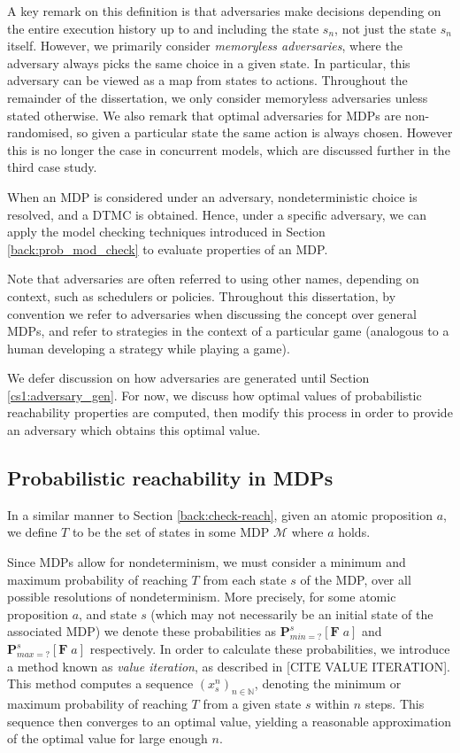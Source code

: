 A key remark on this definition is that adversaries make decisions depending on the entire execution history up to and including the state $s_n$, not just the state $s_n$ itself. However, we primarily consider \emph{memoryless adversaries}, where the adversary always picks the same choice in a given state. In particular, this adversary can be viewed as a map from states to actions.  Throughout the remainder of the dissertation, we only consider memoryless adversaries unless stated otherwise. We also remark that optimal adversaries for MDPs are non-randomised, so given a particular state the same action is always chosen. However this is no longer the case in concurrent models, which are discussed further in the third case study.

When an MDP is considered under an adversary, nondeterministic choice is resolved, and a DTMC is obtained. Hence, under a specific adversary, we can apply the model checking techniques introduced in Section \ref{back:prob_mod_check} to evaluate properties of an MDP.

Note that adversaries are often referred to using other names, depending on context, such as schedulers or policies. Throughout this dissertation, by convention we refer to adversaries when discussing the concept over general MDPs, and refer to strategies in the context of a particular game (analogous to a human developing a strategy while playing a game).

We defer discussion on how adversaries are generated until Section \ref{cs1:adversary_gen}. For now, we discuss how optimal values of probabilistic reachability properties are computed, then modify this process in order to provide an adversary which obtains this optimal value.

\subsection{Probabilistic reachability in MDPs}
\label{cs1:prob_reach_mdps}

In a similar manner to Section \ref{back:check-reach}, given an atomic proposition $a$, we define $T$ to be the set of states in some MDP $\mathcal{M}$ where $a$ holds.

Since MDPs allow for nondeterminism, we must consider a minimum and maximum probability of reaching $T$ from each state $s$ of the MDP, over all possible resolutions of nondeterminism. More precisely, for some atomic proposition $a$, and state $s$ (which may not necessarily be an initial state of the associated MDP) we denote these probabilities as $\mathbf{P}^{s}_{min=?} [\mathbf{F} \; a]$ and $\mathbf{P}^{s}_{max=?} [\mathbf{F} \; a]$ respectively. In order to calculate these probabilities, we introduce a method known as \emph{value iteration}, as described in [CITE VALUE ITERATION]. This method computes a sequence $(x^n_s)_{n \in \mathbb{N}}$, denoting the minimum or maximum probability of reaching $T$ from a given state $s$ within $n$ steps. This sequence then converges to an optimal value, yielding a reasonable approximation of the optimal value for large enough $n$.

